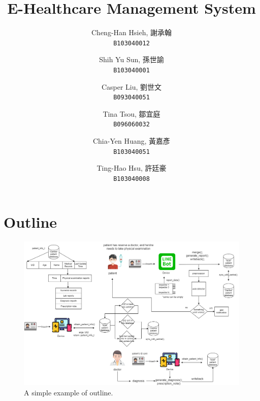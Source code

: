 \documentclass{article}
\begin{document}
\title{E-Healthcare Management System}
\author{
  Cheng-Han Hsieh, 謝承翰\\
  \texttt{B103040012}
  \and
  Shih Yu Sun, 孫世諭\\
  \texttt{B103040001}
  \and
  Casper Liu, 劉世文\\
  \texttt{B093040051}
  \and
  Tina Tsou, 鄒宜庭\\
  \texttt{B096060032}
  \and
  Chia-Yen Huang, 黃嘉彥\\
  \texttt{B103040051}
  \and
  Ting-Hao Hsu, 許廷豪\\
  \texttt{B103040008}
}

\maketitle

\section{Outline}
\label{sec:outline}

  \begin{figure}[h]
    \centering
    \includegraphics[scale = 0.25]{asset/flowchart.png}
    \caption{A simple example of outline.}
    \label{fig:flowchart}
  \end{figure}
\end{document}
